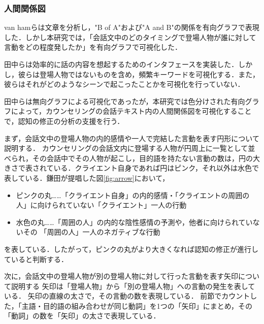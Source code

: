 \documentclass[shuuron]{kuee}
\begin{document}
\subsubsection{人間関係図}

van hamら\cite{van2009mapping}は文章を分析し，"B of A"および"A and B"の関係を有向グラフで表現した．しかし本研究では，「会話文中のどのタイミングで登場人物が誰に対して言動をどの程度発したか」を有向グラフで可視化した．

田中ら\cite{tanaka}は効率的に話の内容を想起するためのインタフェースを実装した．しかし，彼らは登場人物ではないものを含め，頻繁キーワードを可視化する．また，彼らはそれがどのようなシーンで起こったことかを可視化を行っていない．

田中らは無向グラフによる可視化であったが，本研究では色分けされた有向グラフによって，カウンセリングの会話テキスト内の人間関係図を可視化することで，認知の修正の分析の支援を行う．


まず，会話文中の登場人物の内的感情や一人で完結した言動を表す円形について説明する．
カウンセリングの会話文内に登場する人物が円周上に一覧として並べられ，その会話中でその人物が起こし，目的語を持たない言動の数は，円の大きさで表されている．クライエント自身であれば円はピンク，それ以外は水色で表している．鎌田\cite{鎌田穣2002臨床}が提唱した図\ref{fig:arrow}において，
\begin{itemize}
  \item ピンクの丸……「クライエント自身」の内的感情・「クライエントの周囲の人」に向けられていない「クライエント」一人の行動
  \item 水色の丸……「周囲の人」の内的な陰性感情の予測や，他者に向けられていないその
  「周囲の人」一人のネガティブな行動
\end{itemize}
を表している．したがって，ピンクの丸がより大きくなれば認知の修正が進行していると判断する．

次に，会話文中の登場人物が別の登場人物に対して行った言動を表す矢印について説明する
矢印は「登場人物」から「別の登場人物」への言動の発生を表している．
矢印の直線の太さで，その言動の数を表現している．
前節でカウントした，「主語・目的語の組み合わせが同じ動詞」を1つの「矢印」にまとめ，その「動詞」の数を「矢印」の太さで表現している．
\end{document}
